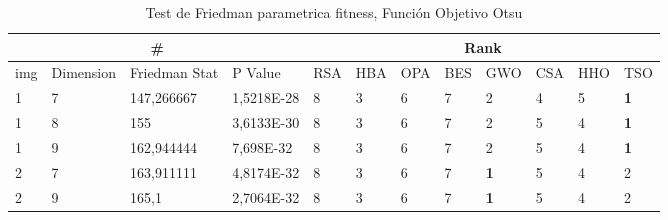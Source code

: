 \documentclass[conference]{IEEEtran}
\begin{document}
\begin{table}[]
	\centering
	\caption{Test de Friedman parametrica fitness, Función Objetivo Otsu}
	\begin{tabular}{|llll|llllllll|}
		\hline
		\multicolumn{4}{|c|}{\#} & \multicolumn{8}{c|}{Rank} \\ \hline
		\multicolumn{1}{|l|}{img} & \multicolumn{1}{l|}{Dimension} & \multicolumn{1}{l|}{Friedman Stat} & P Value    & \multicolumn{1}{l|}{RSA} & \multicolumn{1}{l|}{HBA} & \multicolumn{1}{l|}{OPA} & \multicolumn{1}{l|}{BES} & \multicolumn{1}{l|}{GWO}        & \multicolumn{1}{l|}{CSA} & \multicolumn{1}{l|}{HHO} & TSO                    \\ \hline 
		\multicolumn{1}{|l|}{1}   & \multicolumn{1}{l|}{7}         & \multicolumn{1}{l|}{147,266667}    & 1,5218E-28 & \multicolumn{1}{l|}{8}   & \multicolumn{1}{l|}{3}   & \multicolumn{1}{l|}{6}   & \multicolumn{1}{l|}{7}   & \multicolumn{1}{l|}{2}          & \multicolumn{1}{l|}{4}   & \multicolumn{1}{l|}{5}   & \textbf{1}             \\ \hline
		\multicolumn{1}{|l|}{1}   & \multicolumn{1}{l|}{8}         & \multicolumn{1}{l|}{155}           & 3,6133E-30 & \multicolumn{1}{l|}{8}   & \multicolumn{1}{l|}{3}   & \multicolumn{1}{l|}{6}   & \multicolumn{1}{l|}{7}   & \multicolumn{1}{l|}{2}          & \multicolumn{1}{l|}{5}   & \multicolumn{1}{l|}{4}   & \textbf{1}             \\ \hline
		\multicolumn{1}{|l|}{1}   & \multicolumn{1}{l|}{9}         & \multicolumn{1}{l|}{162,944444}    & 7,698E-32  & \multicolumn{1}{l|}{8}   & \multicolumn{1}{l|}{3}   & \multicolumn{1}{l|}{6}   & \multicolumn{1}{l|}{7}   & \multicolumn{1}{l|}{2}          & \multicolumn{1}{l|}{5}   & \multicolumn{1}{l|}{4}   & \textbf{1}             \\ \hline
		\multicolumn{1}{|l|}{2}   & \multicolumn{1}{l|}{7}         & \multicolumn{1}{l|}{163,911111}    & 4,8174E-32 & \multicolumn{1}{l|}{8}   & \multicolumn{1}{l|}{3}   & \multicolumn{1}{l|}{6}   & \multicolumn{1}{l|}{7}   & \multicolumn{1}{l|}{\textbf{1}} & \multicolumn{1}{l|}{5}   & \multicolumn{1}{l|}{4}   & 2                      \\ \hline
		\multicolumn{1}{|l|}{2}   & \multicolumn{1}{l|}{9}         & \multicolumn{1}{l|}{165,1}         & 2,7064E-32 & \multicolumn{1}{l|}{8}   & \multicolumn{1}{l|}{3}   & \multicolumn{1}{l|}{6}   & \multicolumn{1}{l|}{7}   & \multicolumn{1}{l|}{\textbf{1}} & \multicolumn{1}{l|}{5}   & \multicolumn{1}{l|}{4}   & 2                      \\ \hline

\end{tabular}
\end{table}
\end{document}
